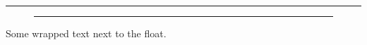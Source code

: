 \documentclass{article}
\begin{document}
\rule{\linewidth}{2pt}

\begin{figure}\rule{\linewidth}{2pt}\end{figure}
Some wrapped text next to the float.
\end{document}
